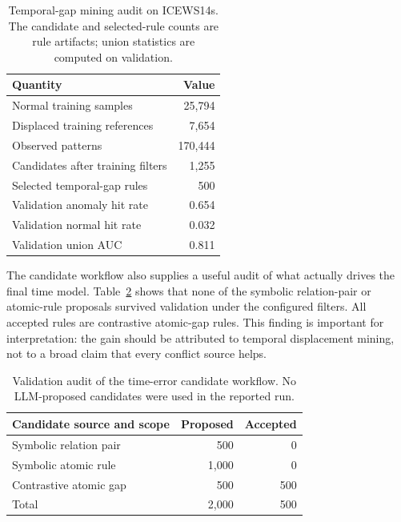 \begin{table}[t]
\centering
\caption{Temporal-gap mining audit on ICEWS14s. The candidate and selected-rule counts are rule artifacts; union statistics are computed on validation.}
\label{tab:time-mining}
\small
\begin{tabular}{lr}
\toprule
Quantity & Value \\
\midrule
Normal training samples & 25,794 \\
Displaced training references & 7,654 \\
Observed patterns & 170,444 \\
Candidates after training filters & 1,255 \\
Selected temporal-gap rules & 500 \\
Validation anomaly hit rate & 0.654 \\
Validation normal hit rate & 0.032 \\
Validation union AUC & 0.811 \\
\bottomrule
\end{tabular}
\end{table}

The candidate workflow also supplies a useful audit of what actually drives the final time model. Table~\ref{tab:workflow-audit} shows that none of the symbolic relation-pair or atomic-rule proposals survived validation under the configured filters. All accepted rules are contrastive atomic-gap rules. This finding is important for interpretation: the gain should be attributed to temporal displacement mining, not to a broad claim that every conflict source helps.

\begin{table}[t]
\centering
\caption{Validation audit of the time-error candidate workflow. No LLM-proposed candidates were used in the reported run.}
\label{tab:workflow-audit}
\small
\begin{tabular}{lrr}
\toprule
Candidate source and scope & Proposed & Accepted \\
\midrule
Symbolic relation pair & 500 & 0 \\
Symbolic atomic rule & 1,000 & 0 \\
Contrastive atomic gap & 500 & 500 \\
\midrule
Total & 2,000 & 500 \\
\bottomrule
\end{tabular}
\end{table}

